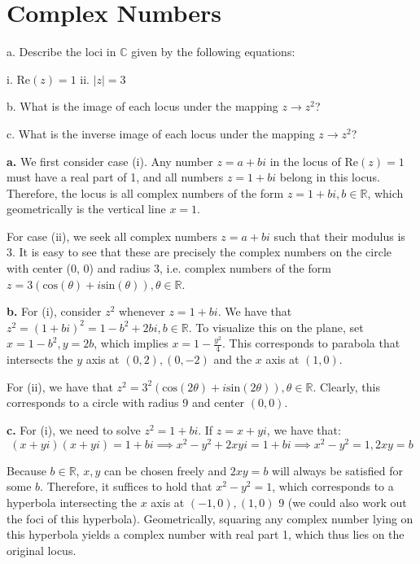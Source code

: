 \section{Complex Numbers}

\begin{exercise}{11}
    a. Describe the loci in $\mathbb{C}$ given by the following equations:

    \quad i. $\text{Re}(z) = 1$ ii. $\lvert z \rvert = 3$

    b. What is the image of each locus under the mapping $z \rightarrow z^2$?

    c. What is the inverse image of each locus under the mapping $z \rightarrow z^2$?
\end{exercise}

\begin{solution}

    \textbf{a.} We first consider case (i). Any number $z = a + bi$ in the locus of $\text{Re}(z) = 1$ must have a real part of 1, and all numbers $z = 1 + bi$ belong in this locus. Therefore, the locus is all complex numbers of the form $z = 1 + bi, b \in \mathbb{R}$, which geometrically is the vertical line $x = 1$.

    For case (ii), we seek all complex numbers $z = a + bi$ such that their modulus is 3. It is easy to see that these are precisely the complex numbers on the circle with center (0, 0) and radius $3$, i.e. complex numbers of the form $z = 3(\text{cos}(\theta) + i \text{sin}(\theta)), \theta \in \mathbb{R}$.

    \textbf{b.} For (i), consider $z^2$ whenever $z = 1 + bi$. We have that $z^2 = (1+bi)^2 = 1-b^2 + 2bi, b \in \mathbb{R}$. To visualize this on the plane, set $x = 1 - b^2, y = 2b$, which implies $x = 1 - \frac{y^2}{4}$. This corresponds to parabola that intersects the $y$ axis at $(0, 2), (0, -2)$ and the $x$ axis at $(1, 0)$.

    For (ii), we have that $z^2 = 3^2(\text{cos}(2\theta) + i\text{sin}(2\theta)), \theta \in \mathbb{R}$. Clearly, this corresponds to a circle with radius 9 and center $(0, 0)$.

    \textbf{c.} For (i), we need to solve $z^2 = 1 + bi$. If $z = x +yi$, we have that:
    $$(x+yi)(x+yi) = 1 + bi \implies x^2 - y^2 + 2xyi = 1 + bi \implies x^2 - y^2 = 1, 2xy = b$$

    Because $b \in \mathbb{R}$, $x, y$ can be chosen freely and $2xy = b$ will always be satisfied for some $b$. Therefore, it suffices to hold that $x^2-y^2 = 1$, which corresponds to a hyperbola intersecting the $x$ axis at $(-1, 0), (1, 0)$ 9 (we could also work out the foci of this hyperbola). Geometrically, squaring any complex number lying on this hyperbola yields a complex number with real part 1, which thus lies on the original locus.


\end{solution}
